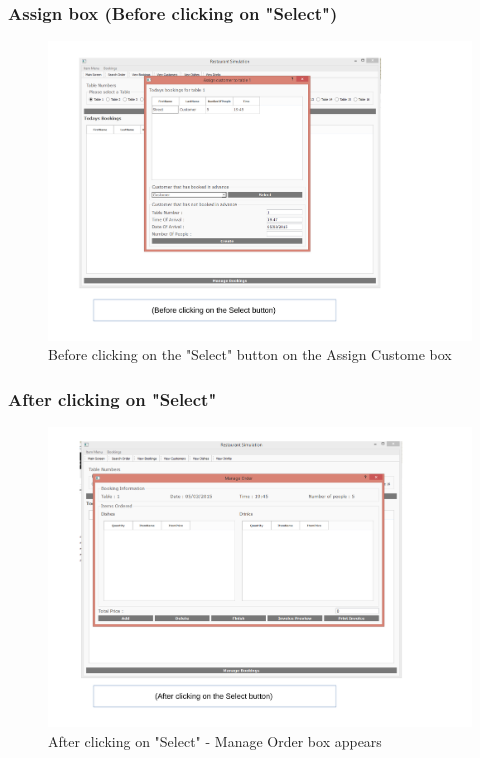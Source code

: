\begin{landscape}
\subsubsection{Assign box (Before clicking on "Select")}
\begin{figure}[H]
    \includegraphics[width = 15cm]{./Maintenance/images/screen15}
    \caption{Before clicking on the "Select" button on the Assign Custome box} \label{fig:screen15}
\end{figure}

\subsubsection{After clicking on "Select"}
\begin{figure}[H]
    \includegraphics[width = 15cm]{./Maintenance/images/screen16}
    \caption{After clicking on "Select"  - Manage Order box appears} \label{fig:screen16}
\end{figure}


\end{landscape}
